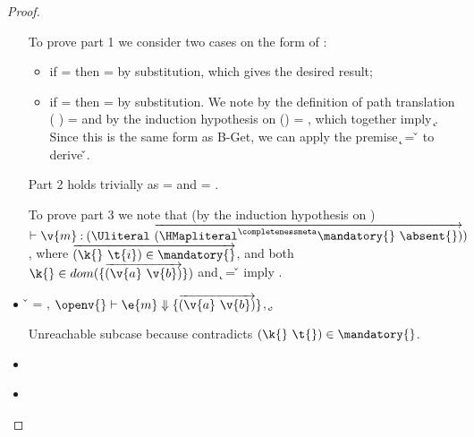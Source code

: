 \begin{lemma}
\begin{proof}
\begin{case}[T-GetHMap]
\begin{itemize}
\begin{subcase}[B-Get]
         To prove part 1 we consider two cases on the form of : 
         \begin{itemize}
           \item
         if {} = \emptyobject{}
         then \object{} = \emptyobject{} by substitution, which gives the desired result;
           \item
         if  = { {}}
         then \object{} = { {}} by substitution.
         We note by the definition of path translation
         {\openv{}}({ {}}) =
         {}
         and by the induction hypothesis on 
         {{\openv{}}()} = {},
         which together imply 
         \inopenv {\openv{}} {\object{}} { {\k{}}}.
         Since this is the same form as B-Get, we can apply the premise
          {\k{}} = {\v{}}
         to derive \inopenv {\openv{}} {\object{}} {\v{}}.
         \end{itemize}
         
         Part 2 holds trivially as \thenprop{\prop{}} = {\topprop{}}
         and \elseprop{\prop{}} = {\topprop{}}.

         To prove part 3 we note that (by the induction hypothesis on )
         $\judgementtwo{}{\hastype{\v{m}}{\Unionsplice{\overrightarrow {\HMapgeneric {\mandatory{}} {\absent{}}}}}}$,
         where $\overrightarrow{\inmandatory{\k{}}{\t{i}}{\mandatory{}}}$, and 
         both
         $\keyinmap{\k{}}{\curlymap{\overrightarrow{({\v{a}}\ {\v{b}})}}}$
         and
          {\k{}} = {\v{}}
         imply .

      \end{subcase}
    \item[]
      \begin{subcase}[B-GetMissing]
        \v{} = \nil,
        $\opsem {\openv{}}
        {\e{m}} {\curlymap{\overrightarrow{({\v{a}}\ {\v{b}})}}}$,
       \opsem {\openv{}} {} {\k{}},

       Unreachable subcase because 
       contradicts ${\inmandatory{\k{}}{\t{}}{\mandatory{}}}$.
      \end{subcase}
    \item[]
      \begin{subcase}[BE-Get1]
      \end{subcase}
    \item[]
      \begin{subcase}[BE-Get2]
      \end{subcase}
  \end{itemize}
\end{case}


\end{proof}
\end{lemma}
